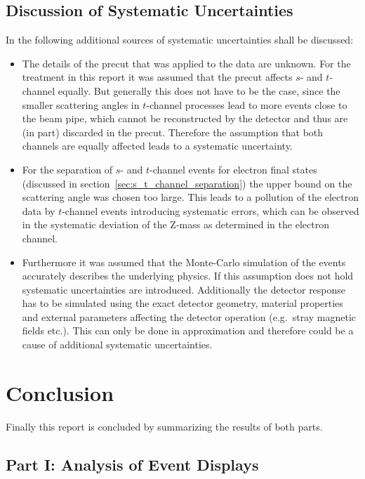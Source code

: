 \documentclass[11pt, a4paper]{article}
\numberwithin{equation}{section}
\begin{document}
\subsection{Discussion of Systematic Uncertainties}
In the following additional sources of systematic uncertainties shall be discussed:
\begin{itemize}
	\item The details of the precut that was applied to the data are unknown.
	For the treatment in this report it was assumed that the precut affects $s$- and $t$-channel equally.
	But generally this does not have to be the case, since the smaller scattering angles in $t$-channel processes lead to more events close to the beam pipe, which cannot be reconstructed by the detector and thus are (in part) discarded in the precut.
	Therefore the assumption that both channels are equally affected leads to a systematic uncertainty.	
	
	\item For the separation of $s$- and $t$-channel events for electron final states (discussed in section~\ref{sec:s_t_channel_separation}) the upper bound on the scattering angle was chosen too large.
	This leads to a pollution of the electron data by $t$-channel events introducing systematic errors, which can be observed in the systematic deviation of the Z-mass as determined in the electron channel.
	
	\item Furthermore it was assumed that the Monte-Carlo simulation of the events accurately describes the underlying physics.
	If this assumption does not hold systematic uncertainties are introduced.
	Additionally the detector response has to be simulated using the exact detector geometry, material properties and external parameters affecting the detector operation (e.g.\ stray magnetic fields etc.).
	This can only be done in approximation and therefore could be a cause of additional systematic uncertainties.
\end{itemize}

\section{Conclusion}
Finally this report is concluded by summarizing the results of both parts.

\subsection{Part I: Analysis of Event Displays}
\end{document}
